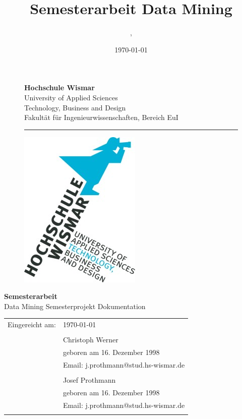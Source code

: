 \documentclass[12pt,					%
							 oneside,			%
							 a4paper,			%
							 halfparskip,		%
							 liststotoc,			%
							 bibtotoc,			%
							 fleqn,				%
							 pointlessnumbers]	%
							 {scrreprt}
\title{Semesterarbeit Data Mining}
\author{\VerfasserC, \Verfasserj}
\date{\today{}}
\makeatletter
\newcommand{\VerfasserC}{Christoph Werner}
\newcommand{\GeburtstagC}{16. Dezember 1998}
\newcommand{\EmailC}{j.prothmann@stud.hs-wismar.de}
\newcommand{\VerfasserJ}{Josef Prothmann}
\newcommand{\GeburtstagJ}{16. Dezember 1998}
\newcommand{\GeburtsortJ}{Dannenberg/ Elbe}
\newcommand{\EmailJ}{j.prothmann@stud.hs-wismar.de}
\newcommand{\Titel}{Data Mining Semesterprojekt Dokumentation}
\makeatother
\begin{document}

	\renewcommand\lstlistingname{Code}
	\renewcommand\lstlistlistingname{Codeverzeichnis}
	
	\begin{titlepage}
		\setlength\headsep{-5mm}
		\begin{figure}[!h]
			\begin{minipage}{0.8\textwidth}
				\textbf{Hochschule Wismar} \\
				University of Applied Sciences \\
				Technology, Business and Design \\
				Fakultät für Ingenieurwissenschaften, Bereich EuI \\
			\rule{\textwidth}{0.5pt}
			\end{minipage}
			\begin{minipage}[r]{0.1\textwidth}
				\begin{flushright}
					\includegraphics[height=6\baselineskip]{pictures/HS-Wismar_Logo-FIW_2010-01.jpg}
				\end{flushright}
			\end{minipage}
		\end{figure}
		\vspace*{6cm}
		\begin{center}
			\Huge
			\textbf{Semesterarbeit} \\
			\vspace{2cm}
			\large \Titel
			\begin{table}[b]
				\begin{tabular}{rl}
					
					Eingereicht am: &\today \\
					\\
					  & \VerfasserC \\ 
					& geboren am \GeburtstagC \\ 
					& Email: \EmailC \\
					\\
					 & \VerfasserJ \\ 
					& geboren am \GeburtstagJ \\ 
					& Email: \EmailJ \\
					\\


\end{tabular}
\end{table}
\end{center}
\end{titlepage}
\end{document}
